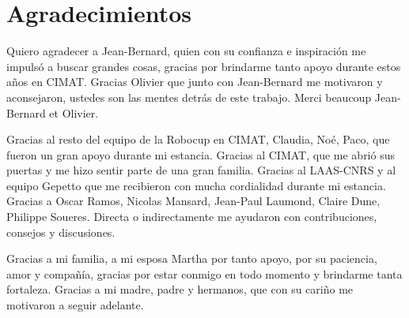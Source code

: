 \chapter*{Agradecimientos}
\thispagestyle{empty}

Quiero agradecer a Jean-Bernard, quien con su confianza e inspiraci\'on me impuls\'o a buscar grandes cosas, gracias por brindarme tanto apoyo durante estos a\~nos en CIMAT. Gracias Olivier que junto con Jean-Bernard me motivaron y aconsejaron, ustedes son las mentes detr\'as de este trabajo. Merci beaucoup Jean-Bernard et Olivier.

Gracias al resto del equipo de la Robocup en CIMAT, Claudia, No\'e, Paco, que fueron un gran apoyo durante mi estancia. Gracias al CIMAT, que me abri\'o sus puertas y me hizo sentir parte de una gran familia. Gracias al LAAS-CNRS y al equipo Gepetto que me recibieron con mucha cordialidad durante mi estancia. Gracias a Oscar Ramos, Nicolas Mansard, Jean-Paul Laumond, Claire Dune, Philippe Soueres. Directa o indirectamente me ayudaron con contribuciones, consejos y discusiones.

Gracias a mi familia, a mi esposa Martha por tanto apoyo, por su paciencia, amor y compa\~n\'ia, gracias por estar conmigo en todo momento y brindarme tanta fortaleza. Gracias a mi madre, padre y hermanos, que con su cari\~no me motivaron a seguir adelante.


